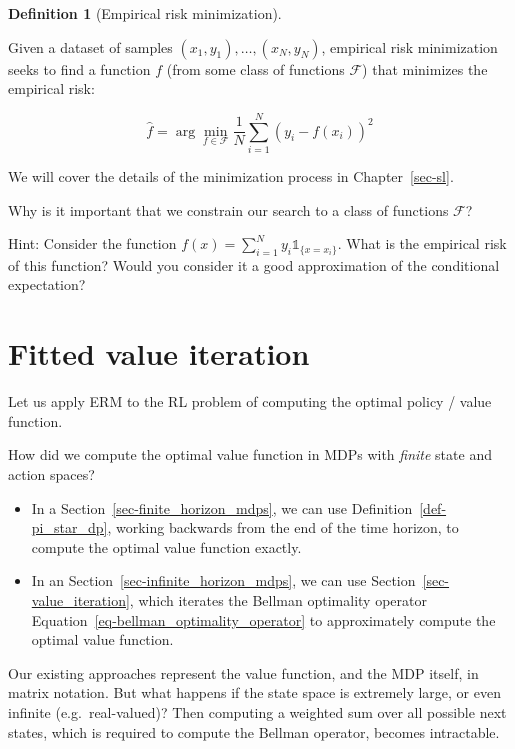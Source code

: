 \documentclass[
  letterpaper,
  DIV=11,
  numbers=noendperiod]{scrreprt}
\theoremstyle{plain}
\theoremstyle{plain}
\theoremstyle{definition}
\theoremstyle{definition}
\newtheorem{definition}{Definition}[chapter]
\theoremstyle{remark}
\begin{document}
\begin{definition}[Empirical risk
minimization]\protect\hypertarget{def-empirical_risk_minimization}{}\label{def-empirical_risk_minimization}

Given a dataset of samples \((x_1, y_1), \dots, (x_N, y_N)\), empirical
risk minimization seeks to find a function \(f\) (from some class of
functions \(\mathcal{F}\)) that minimizes the empirical risk:

\[
\hat f = \arg\min_{f \in \mathcal{F}} \frac{1}{N} \sum_{i=1}^N (y_i - f(x_i))^2
\]

We will cover the details of the minimization process in
Chapter~\ref{sec-sl}.

\end{definition}

Why is it important that we constrain our search to a class of functions
\(\mathcal{F}\)?

Hint: Consider the function
\(f(x) = \sum_{i=1}^N y_i \mathbb{1}_{\{ x = x_i \}}\). What is the
empirical risk of this function? Would you consider it a good
approximation of the conditional expectation?

\section{Fitted value iteration}\label{fitted-value-iteration}

Let us apply ERM to the RL problem of computing the optimal policy /
value function.

How did we compute the optimal value function in MDPs with \emph{finite}
state and action spaces?

\begin{itemize}
\item
  In a Section~\ref{sec-finite_horizon_mdps}, we can use
  Definition~\ref{def-pi_star_dp}, working backwards from the end of the
  time horizon, to compute the optimal value function exactly.
\item
  In an Section~\ref{sec-infinite_horizon_mdps}, we can use
  Section~\ref{sec-value_iteration}, which iterates the Bellman
  optimality operator Equation~\ref{eq-bellman_optimality_operator} to
  approximately compute the optimal value function.
\end{itemize}

Our existing approaches represent the value function, and the MDP
itself, in matrix notation. But what happens if the state space is
extremely large, or even infinite (e.g.~real-valued)? Then computing a
weighted sum over all possible next states, which is required to compute
the Bellman operator, becomes intractable.
\end{document}
